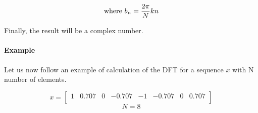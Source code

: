 \documentclass[
  oneside,
  11pt, a4paper,
  footinclude=true,
  headinclude=true,
  cleardoublepage=empty
]{scrbook}
\begin{document}
\begin{equation*}
    \text{where } \\ b_{n} = \frac{ 2 \pi}{N}kn \\
\end{equation*}


Finally, the result will be a complex number.



\paragraph{Example} Let us now follow an example of calculation of the DFT for a sequence \(x\) with N number of elements.


\begin{equation*}
    x = 
    \begin{bmatrix}
        1 & 0.707 & 0 & -0.707 & -1 & -0.707 & 0 & 0.707\\
    \end{bmatrix}
\end{equation*}
\begin{equation*}
    N = 8
\end{equation*}
\end{document}
